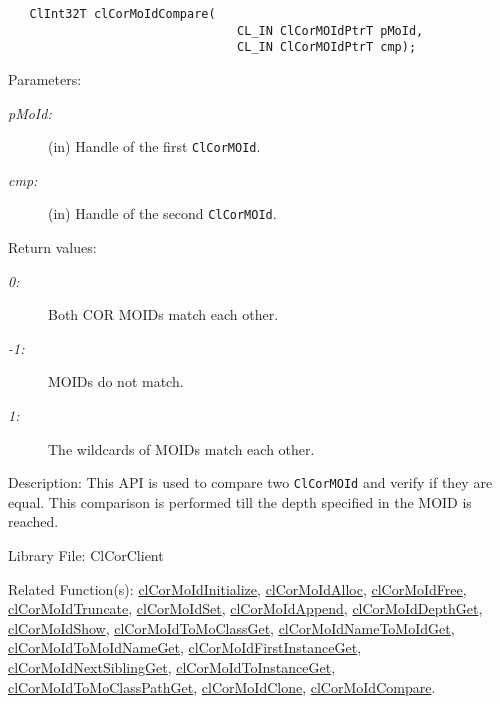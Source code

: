 \begin{flushleft}
\begin{Desc}
\footnotesize\begin{verbatim}   ClInt32T clCorMoIdCompare(
                       			CL_IN ClCorMOIdPtrT pMoId,
                       			CL_IN ClCorMOIdPtrT cmp);
\end{verbatim}
\normalsize
\end{Desc}
\begin{Desc}
\item[Parameters:]
\begin{description}
\item[{\em p\-MoId:}](in) Handle of the first {\tt{ClCorMOId}}. 
\item[{\em cmp:}](in) Handle of the second {\tt{ClCorMOId}}.\end{description}
\end{Desc}
\begin{Desc}
\item[Return values:]
\begin{description}
\item[{\em 0:}]Both COR MOIDs match each other.
\item[{\em -1:}] MOIDs do not match. 
\item[{\em 1:}]The wildcards of MOIDs match each other.\end{description}
\end{Desc}
\begin{Desc}
\item[Description:]This API is used to compare two {\tt{ClCorMOId}} and verify if they are equal. This comparison is performed till the depth 
specified in the MOID is reached.\end{Desc}
\begin{Desc}
\item[Library File:]Cl\-Cor\-Client\end{Desc}
\begin{Desc}
\item[Related Function(s):]\hyperlink{pagecor100}{cl\-Cor\-MoId\-Initialize}, \hyperlink{pagecor113}{cl\-Cor\-MoId\-Alloc}, 
\hyperlink{pagecor114}{cl\-Cor\-MoId\-Free},
\hyperlink{pagecor115}{cl\-Cor\-MoId\-Truncate}, 
\hyperlink{pagecor116}{cl\-Cor\-MoId\-Set}, 
\hyperlink{pagecor117}{cl\-Cor\-MoId\-Append}, 
\hyperlink{pagecor118}{cl\-Cor\-MoId\-Depth\-Get}, 
\hyperlink{pagecor119}{cl\-Cor\-MoId\-Show}, 
\hyperlink{pagecor120}{cl\-Cor\-MoId\-To\-Mo\-Class\-Get}, 
\hyperlink{pagecor121}{cl\-Cor\-MoId\-Name\-To\-MoId\-Get}, 
\hyperlink{pagecor122}{cl\-Cor\-MoId\-To\-MoId\-Name\-Get}, 
\hyperlink{pagecor123}{cl\-Cor\-MoId\-First\-Instance\-Get},
\hyperlink{pagecor124}{cl\-Cor\-MoId\-Next\-Sibling\-Get}, 
\hyperlink{pagecor125}{cl\-Cor\-MoId\-To\-Instance\-Get}, 
\hyperlink{pagecor126}{cl\-Cor\-MoId\-To\-Mo\-Class\-Path\-Get}, 
\hyperlink{pagecor127}{cl\-Cor\-MoId\-Clone}, 
\hyperlink{pagecor128}{cl\-Cor\-MoId\-Compare}. \end{Desc}
\newpage



\end{flushleft}
